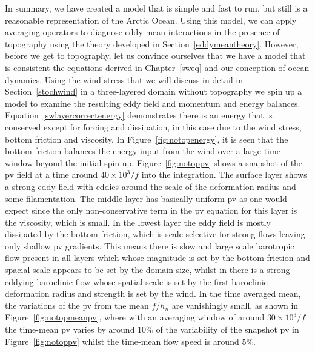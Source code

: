 \documentclass[12pt,a4paper]{report}
\newcommand*\figref[1]{Figure~\ref{#1}}
\newcommand*\equref[1]{Equation~\eqref{#1}}
\newcommand*\secref[1]{Section~\ref{#1}}
\begin{document}
  In summary, we have created a model that is simple and fast to run, but still is a
  reasonable representation of the Arctic Ocean. Using this model, we can apply 
  averaging operators to diagnose eddy-mean interactions in the 
  presence of topography using the theory developed
  in \secref{eddymeantheory}. However, before we get to topography, let us convince
  ourselves that we have a model that is consistent the equations derived in
  Chapter~\ref{sweq} and our conception of ocean dynamics. 
  Using the wind stress that we will discuss in detail in \secref{stochwind} in
  a three-layered domain without topography we spin up a model to examine the 
  resulting eddy field and momentum and energy balances. 
  \equref{swlayercorrectenergy} demonstrates there is an energy that is conserved 
  except for forcing and dissipation, in this case due to
   the wind stress, bottom 
  friction and viscosity. In \figref{fig:notopenergy}, it
  is seen that 
  the bottom friction balances the energy input from the wind over a large time
  window beyond the initial spin up. \figref{fig:notoppv} shows a snapshot of the \gls{pv}
  field at a time around $40 \times 10^{3}/f$ into the integration. The surface layer shows a strong eddy
  field with eddies around the scale of the deformation radius and some filamentation.
  The middle layer has basically uniform \gls{pv} as one would expect since 
  the only non-conservative term in the \gls{pv} equation for this layer is the
  viscosity, which is small. In the lowest layer the eddy field is mostly dissipated
  by the bottom friction, which is scale selective for strong flows leaving only shallow
  \gls{pv} gradients. This means there is slow and large scale barotropic flow
  present in all layers which whose magnitude is set by the bottom friction and spacial
  scale appears to be set by the domain size, whilst in there is a strong eddying 
  baroclinic flow whose spatial scale is set by the first baroclinic deformation radius
  and strength is set by the wind. In the time averaged mean, the variations of the
   \gls{pv} from the mean $f/h_{n}$ are vanishingly small, as shown in \figref{fig:notopmeanpv}, where with an averaging window of around $30 \times 10^{3}/f$
   the time-mean \gls{pv} varies by around $10 \%$ of the variability of the snapshot 
   \gls{pv} in \figref{fig:notoppv} whilst the time-mean flow speed is around $5 \%$.
  
  
  
\end{document}
